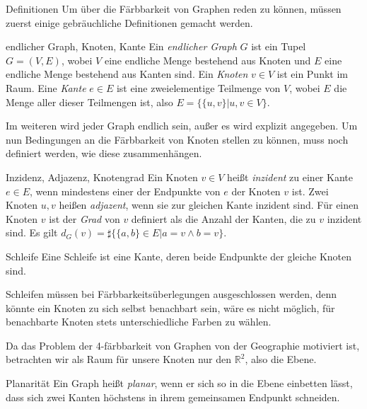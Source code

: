 \begin{chapter}{Definitionen}
  Um über die Färbbarkeit von Graphen reden zu können, müssen zuerst einige gebräuchliche Definitionen gemacht werden. 
  \begin{definition}{endlicher Graph, Knoten, Kante}
   Ein \textit{endlicher Graph} $G$ ist ein Tupel $G=(V,E)$, wobei $V$ eine endliche Menge bestehend aus Knoten und $E$ eine endliche Menge bestehend aus Kanten sind. Ein \textit{Knoten} $v \in V$ ist ein Punkt im Raum. Eine \textit{Kante} $e \in E$ ist eine zweielementige Teilmenge von $V$, wobei $E$ die Menge aller dieser Teilmengen ist, also $E = \{\{u,v\}|u,v \in V\}$.
  \end{definition}
  
  Im weiteren wird jeder Graph endlich sein, außer es wird explizit angegeben. Um nun Bedingungen an die Färbbarkeit von Knoten stellen zu können, muss noch definiert werden, wie diese zusammenhängen.
  
  \begin{definition}{Inzidenz, Adjazenz, Knotengrad}
   Ein Knoten $v \in V$ heißt \textit{inzident} zu einer Kante $e \in E$, wenn mindestens einer der Endpunkte von $e$ der Knoten $v$ ist. Zwei Knoten $u,v$ heißen \textit{adjazent}, wenn sie zur gleichen Kante inzident sind. Für einen Knoten $v$ ist der \textit{Grad} von $v$ definiert als die Anzahl der Kanten, die zu $v$ inzident sind. Es gilt $d_G(v) = \sharp\{\{a,b\} \in E | a=v \wedge b=v \}$.
  \end{definition}
  
  \begin{definition}{Schleife}
   Eine Schleife ist eine Kante, deren beide Endpunkte der gleiche Knoten sind.
  \end{definition}
  Schleifen müssen bei Färbbarkeitsüberlegungen ausgeschlossen werden, denn könnte ein Knoten zu sich selbst benachbart sein, wäre es nicht möglich, für benachbarte Knoten stets unterschiedliche Farben zu wählen.
  
  Da das Problem der 4-färbbarkeit von Graphen von der Geographie motiviert ist, betrachten wir als Raum für unsere Knoten nur den $\mathbb{R}^2$, also die Ebene.
  
  \begin{definition}{Planarität}
   Ein Graph heißt \textit{planar}, wenn er sich so in die Ebene einbetten lässt, dass sich zwei Kanten höchstens in ihrem gemeinsamen Endpunkt schneiden.
  \end{definition}
  

\end{chapter}
